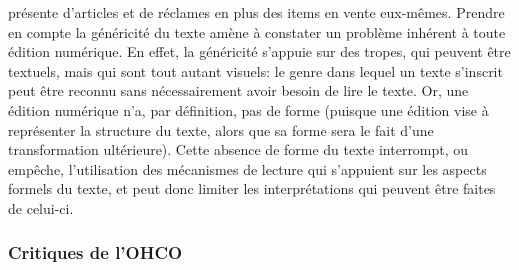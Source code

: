 présente d'articles et de réclames en plus des items en vente eux-mêmes. Prendre en compte la généricité du texte amène à constater un problème inhérent à toute édition numérique. En effet, la généricité s'appuie sur des tropes, qui peuvent être textuels, mais qui sont tout autant visuels: le genre dans lequel un texte s'inscrit peut être reconnu sans nécessairement avoir besoin de lire le texte. Or, une édition numérique n'a, par définition, pas de forme (puisque une édition \xml{} vise à représenter la structure du texte, alors que sa forme sera le fait d'une transformation ultérieure). Cette absence de forme du texte interrompt, ou empêche, l'utilisation des mécanismes de lecture qui s'appuient sur les aspects formels du texte, et peut donc limiter les interprétations qui peuvent être faites de celui-ci.

\subsubsection{Critiques de l'OHCO}
